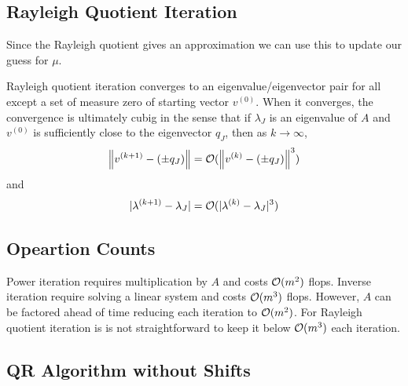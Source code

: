 \documentclass[12pt]{article}
\begin{document}
\subsection{Rayleigh Quotient Iteration}
Since the Rayleigh quotient gives an approximation we can use this to update our guess for \( \mu \).

\begin{algorithm}
\begin{algorithmic}
\EndFor
\end{algorithmic}
\end{algorithm}

\begin{theorem}
Rayleigh quotient iteration converges to an eigenvalue/eigenvector pair for all except a set of measure zero of starting vector \( v^{(0)} \). When it converges, the convergence is ultimately cubig in the sense that if \( \lambda_J \) is an eigenvalue of \( A \) and \( v^{(0)} \) is sufficiently close to the eigenvector \( q_J \), then as \( k\to\infty \),
\begin{align*}
    \left\lVert v^{(k+1)} - (\pm q_J)\right\rVert = \mathcal{O}(\left\lVert v^{(k)}-(\pm q_J)\right\rVert^3)
\end{align*}
and
\begin{align*}
    |\lambda^{(k+1)} - \lambda_J| = \mathcal{O}(|\lambda^{(k)} - \lambda_J|^3)
\end{align*}
\end{theorem}

\subsection{Opeartion Counts}
Power iteration requires multiplication by \( A \) and costs \( \mathcal{O}(m^2) \) flops. Inverse iteration require solving a linear system and costs \( \mathcal{O}(m^3) \) flops. However, \( A \) can be factored ahead of time reducing each iteration to \( \mathcal{O}(m^2) \). For Rayleigh quotient iteration is is not straightforward to keep it below \( \mathcal{O}(m^3) \) each iteration.

\subsection{QR Algorithm without Shifts}
\end{document}
